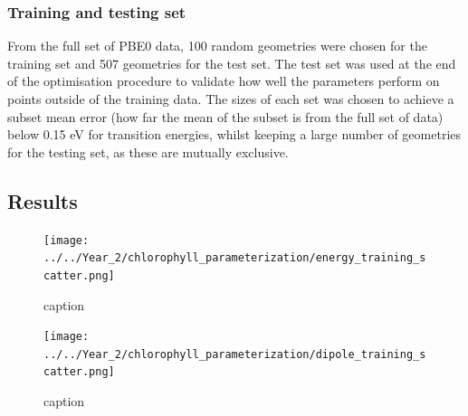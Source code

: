 \subsubsection{Training and testing set}
\label{subsubsec:train_test}
From the full set of PBE0 data, 100 random geometries were chosen for the training 
set and 507 geometries for the test set. The test set was used at the end of the 
optimisation procedure to validate how well the parameters perform on points outside 
of the training data. The sizes of each set was chosen to achieve a subset mean
error (how far the mean of the subset is from the full set of data) below 0.15 eV
for transition energies, whilst keeping a large number of geometries for the testing
set, as these are mutually exclusive.

\afterpartskip
\subsection{Results}
\label{subsec:chl_opt_results}

\begin{figure}
    \centering
    \texttt{[image: ../../Year\_2/chlorophyll\_parameterization/energy\_training\_scatter.png]}
    \label{fig:energy_training_scatter}
    \caption{caption}
\end{figure}

\begin{figure}
    \centering
    \texttt{[image: ../../Year\_2/chlorophyll\_parameterization/dipole\_training\_scatter.png]}
    \label{fig:dipole_training_scatter}
    \caption{caption}
\end{figure}


